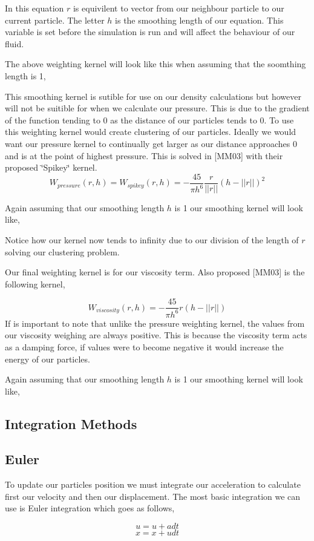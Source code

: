 In this equation $r$ is equivilent to vector from our neighbour particle to our current particle. The letter $h$ is the smoothing length of our equation. This variable is set before the simulation is run and will affect the behaviour of our fluid.\par
The above weighting kernel will look like this when assuming that the soomthing length is 1,\par
 This smoothing kernel is sutible for use on our density calculations but however will not be suitible for when we calculate our pressure. This is due to the gradient of the function tending to 0 as the distance of our particles tends to 0. To use this weighting kernel would create clustering of our particles. Ideally we would want our pressure kernel to continually get larger as our distance approaches 0 and is at the point of highest pressure. This is solved in \mbox{[}M\-M03\mbox{]} with their proposed \char`\"{}\-Spikey\char`\"{} kernel. \[ W_{pressure}(r,h) = W_{spikey}(r,h) = -\frac{45}{\pi h^6} \frac{r}{||r||}(h-||r||)^2 \]

Again assuming that our smoothing length $h$ is 1 our smoothing kernel will look like,\par
 Notice how our kernel now tends to infinity due to our division of the length of $r$ solving our clustering problem.

Our final weighting kernel is for our viscosity term. Also proposed \mbox{[}M\-M03\mbox{]} is the following kernel,\par
 \[ W_{viscosity}(r,h) = -\frac{45}{\pi h^6}r(h-||r||) \] If is important to note that unlike the pressure weighting kernel, the values from our viscosity weighing are always positive. This is because the viscosity term acts as a damping force, if values were to become negative it would increase the energy of our particles.\par
Again assuming that our smoothing length $h$ is 1 our smoothing kernel will look like,\par
 \subsection*{Integration Methods }

\subsection*{Euler }

To update our particles position we must integrate our acceleration to calculate first our velocity and then our displacement. The most basic integration we can use is Euler integration which goes as follows,\par
 \[ u = u + adt \] \[ x = x + udt \]

